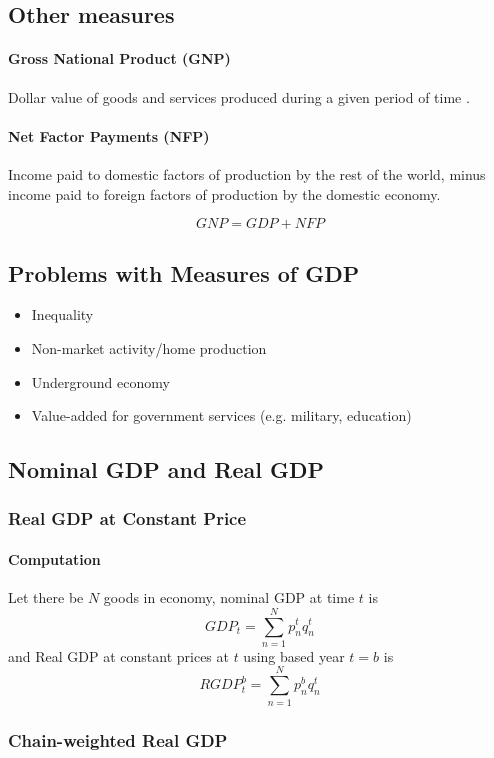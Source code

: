 \documentclass[11pt]{article}
\begin{document}
\subsection{Other measures}
	\paragraph{Gross National Product (GNP)} Dollar value of goods and services produced during a given period of time .
	
	\paragraph{Net Factor Payments (NFP)} Income paid to domestic factors of production by the rest of the world, minus income paid to foreign factors of production by the domestic economy.

	\[
		GNP = GDP + NFP
	\]
	
\subsection{Problems with Measures of GDP}
\begin{itemize}
	\item Inequality
	\item Non-market activity/home production
	\item Underground economy
	\item Value-added for government services (e.g. military, education)
\end{itemize}

\subsection{Nominal GDP and Real GDP}
	\subsubsection{Real GDP at Constant Price}
		\paragraph{Computation} Let there be $N$ goods in economy, nominal GDP at time $t$ is 
		\[
			GDP_t = \sum_{n=1}^N p_n^t q_n^t
		\]
		and Real GDP at constant prices at $t$ using based year $t = b$ is 
		\[
			RGDP_t^b = \sum_{n=1}^N p_n^b q_n^t
		\]
	\subsubsection{Chain-weighted Real GDP}
\end{document}
